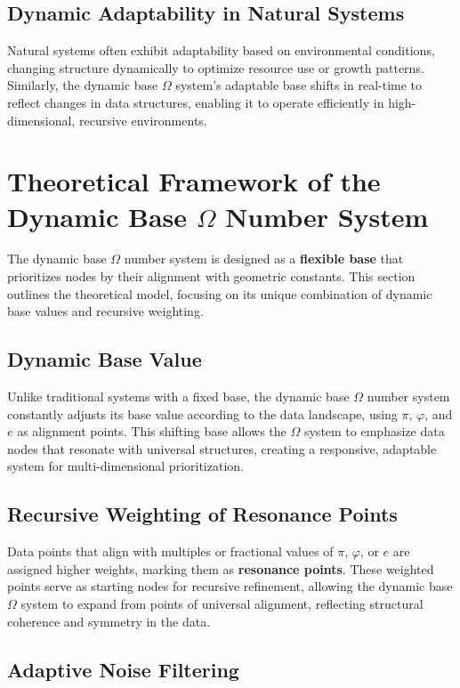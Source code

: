 \documentclass{article}
\begin{document}
\subsection{Dynamic Adaptability in Natural Systems}

Natural systems often exhibit adaptability based on environmental conditions, changing structure dynamically to optimize resource use or growth patterns. Similarly, the dynamic base $\Omega$ system’s adaptable base shifts in real-time to reflect changes in data structures, enabling it to operate efficiently in high-dimensional, recursive environments.

\section{Theoretical Framework of the Dynamic Base $\Omega$ Number System}

The dynamic base $\Omega$ number system is designed as a \textbf{flexible base} that prioritizes nodes by their alignment with geometric constants. This section outlines the theoretical model, focusing on its unique combination of dynamic base values and recursive weighting.

\subsection{Dynamic Base Value}

Unlike traditional systems with a fixed base, the dynamic base $\Omega$ number system constantly adjusts its base value according to the data landscape, using $\pi$, $\varphi$, and $e$ as alignment points. This shifting base allows the $\Omega$ system to emphasize data nodes that resonate with universal structures, creating a responsive, adaptable system for multi-dimensional prioritization.

\subsection{Recursive Weighting of Resonance Points}

Data points that align with multiples or fractional values of $\pi$, $\varphi$, or $e$ are assigned higher weights, marking them as \textbf{resonance points}. These weighted points serve as starting nodes for recursive refinement, allowing the dynamic base $\Omega$ system to expand from points of universal alignment, reflecting structural coherence and symmetry in the data.

\subsection{Adaptive Noise Filtering}
\end{document}

